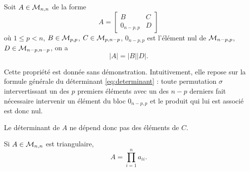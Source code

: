 \begin{proposition*}
  Soit $A \in \mathcal{M}_{n,n}$ de la forme
  $$
  A = \left[\begin{array}{cc}
      B & C \\ 0_{n-p, p} & D
    \end{array}\right]
  $$
  où $1 \leq p < n$, $B \in \mathcal{M}_{p, p}$, $C \in \mathcal{M}_{p, n-p}$, $0_{n-p, p}$ est l'élément nul de $\mathcal{M}_{n-p, p}$, $D \in \mathcal{M}_{n-p, n-p}$, on a
  $$
  |A| = |B| |D|.
  $$
\end{proposition*}

\proof
Cette propriété est donnée sans démonstration. Intuitivement, elle repose sur la formule générale du déterminant \eqref{eq:determinant} : toute permutation $\sigma$ intervertissant un des $p$ premiers éléments avec un des $n-p$ derniers fait nécessaire intervenir un élément du bloc $0_{n-p, p}$ et le produit qui lui est associé est donc nul.
\eproof

\remark Le déterminant de $A$ ne dépend donc pas des éléments de $C$.

\begin{proposition*}
  Si $A \in \mathcal{M}_{n,n}$ est triangulaire, 
  $$
  A = \prod_{i=1}^n a_{ii}.
  $$
\end{proposition*}

